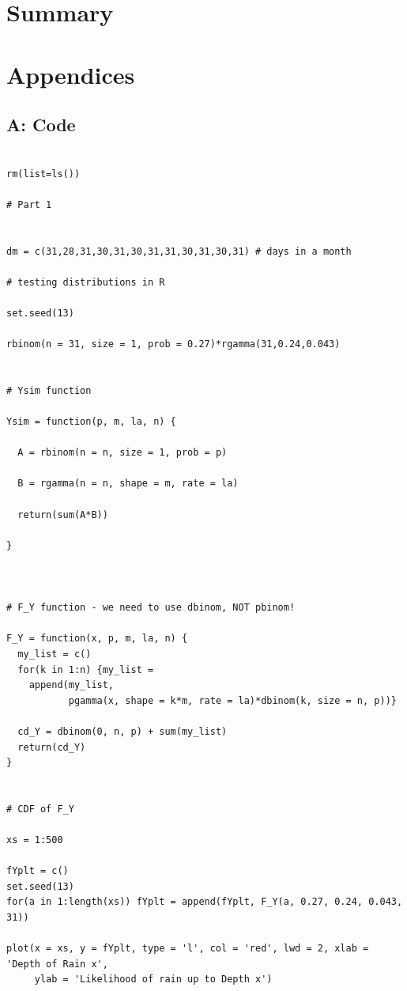 \documentclass[a4paper, 11pt, oneside]{article}
\begin{document}
\section{Summary}





\newpage

\section{Appendices}

\subsection{A: Code}

\begin{verbatim}

rm(list=ls())

# Part 1


dm = c(31,28,31,30,31,30,31,31,30,31,30,31) # days in a month

# testing distributions in R

set.seed(13)

rbinom(n = 31, size = 1, prob = 0.27)*rgamma(31,0.24,0.043)


# Ysim function

Ysim = function(p, m, la, n) {
  
  A = rbinom(n = n, size = 1, prob = p)
  
  B = rgamma(n = n, shape = m, rate = la)
  
  return(sum(A*B))

}



# F_Y function - we need to use dbinom, NOT pbinom!

F_Y = function(x, p, m, la, n) {
  my_list = c()
  for(k in 1:n) {my_list = 
    append(my_list, 
           pgamma(x, shape = k*m, rate = la)*dbinom(k, size = n, p))}
  
  cd_Y = dbinom(0, n, p) + sum(my_list)
  return(cd_Y)
}


# CDF of F_Y

xs = 1:500

fYplt = c()
set.seed(13)
for(a in 1:length(xs)) fYplt = append(fYplt, F_Y(a, 0.27, 0.24, 0.043, 31))

plot(x = xs, y = fYplt, type = 'l', col = 'red', lwd = 2, xlab = 'Depth of Rain x',
     ylab = 'Likelihood of rain up to Depth x')




\end{verbatim}
\end{document}
